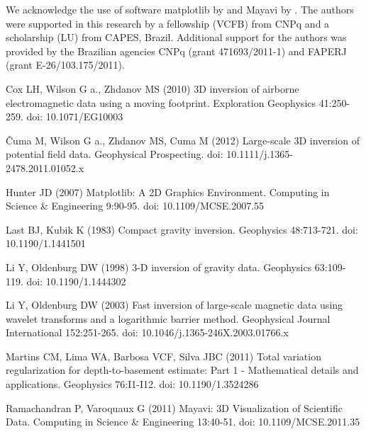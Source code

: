 \documentclass[twocolumn,draft]{svjour3}
\begin{document}
\begin{acknowledgements}
We acknowledge the use of software
matplotlib by \citet{matplotlib} and
Mayavi by \citet{mayavi}.
The authors were supported in this research by
a fellowship (VCFB) from CNPq
and a scholarship (LU) from CAPES, Brazil.
Additional support for the authors
was provided by the Brazilian agencies
CNPq (grant 471693/2011-1) and FAPERJ (grant E-26/103.175/2011).
\end{acknowledgements}


\begin{thebibliography}{}

Cox LH, Wilson G a., Zhdanov MS (2010)
3D inversion of airborne electromagnetic data using a moving footprint.
Exploration Geophysics 41:250-259. doi: 10.1071/EG10003

\v{C}uma M, Wilson G a., Zhdanov MS, Cuma M (2012)
Large-scale 3D inversion of potential field data. Geophysical Prospecting.
doi: 10.1111/j.1365-2478.2011.01052.x

Hunter JD (2007)
Matplotlib: A 2D Graphics Environment. Computing in Science \& Engineering
9:90-95. doi: 10.1109/MCSE.2007.55

Last BJ, Kubik K (1983)
Compact gravity inversion. Geophysics 48:713-721. doi: 10.1190/1.1441501

Li Y, Oldenburg DW (1998)
3-D inversion of gravity data. Geophysics 63:109-119.
doi: 10.1190/1.1444302

Li Y, Oldenburg DW (2003)
Fast inversion of large-scale magnetic data using wavelet transforms and a
logarithmic barrier method. Geophysical Journal International 152:251-265.
doi: 10.1046/j.1365-246X.2003.01766.x

Martins CM, Lima WA, Barbosa VCF, Silva JBC (2011)
Total variation regularization for depth-to-basement estimate:
Part 1 - Mathematical details and applications. Geophysics 76:I1-I12.
doi: 10.1190/1.3524286

Ramachandran P, Varoquaux G (2011)
Mayavi: 3D Visualization of Scientific Data. Computing in Science \& Engineering
13:40-51. doi: 10.1109/MCSE.2011.35


\end{thebibliography}
\end{document}
